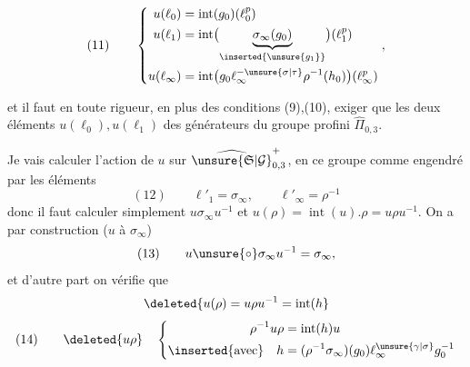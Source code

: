 


\[
(11)\qquad
\left\{
\begin{aligned}
u(\ell_0)&=\operatorname{int}(g_0)(\ell_0^p)\\
u(\ell_1)&=\operatorname{int}\bigl(\underbrace{\sigma_\infty(g_0)}_{\inserted{\unsure{g_1}}}\bigr)(\ell_1^p)\\
u(\ell_\infty)&=\operatorname{int}\bigl(g_0\ell_\infty^{-\unsure{\sigma|\tau}}\rho^{-1}(h_0)\bigr)(\ell_\infty^p)
\end{aligned}
\right.,
\]

et il faut en toute rigueur, en plus des conditions (9),(10), exiger que les deux éléments $u(\ell_0),u(\ell_1)$   des générateurs du groupe profini $\widehat{\Pi}_{0,3}$.

Je vais calculer l'action de $u$ sur $\widehat{\unsure{\mathfrak S|\mathcal G}}_{0,3}^{+}$, en  ce groupe comme engendré par les éléments
\[
(12)\qquad \ell'_1=\sigma_\infty,\qquad \ell'_\infty=\rho^{-1}
\]
donc il faut calculer simplement  $u\sigma_\infty u^{-1}$ et $u(\rho)=\operatorname{int}(u).\rho=u\rho u^{-1}$. On a par construction ($u$  à $\sigma_\infty$)
\[
(13)\qquad u\unsure{\circ}\sigma_\infty u^{-1}=\sigma_\infty,
\]
et d'autre part on vérifie que
\[
\deleted{u(\rho)=u\rho u^{-1}=\operatorname{int}(h}
\]
\[
(14)\qquad \deleted{u\rho}\quad
\left\{
\begin{aligned}
\rho^{-1}u\rho&=\operatorname{int}(h)u\\
\inserted{\text{avec}}\quad h&=(\rho^{-1}\sigma_\infty)(g_0)\ell_\infty^{\unsure{\gamma|\sigma}}g_0^{-1}
\end{aligned}
\right.
\]

